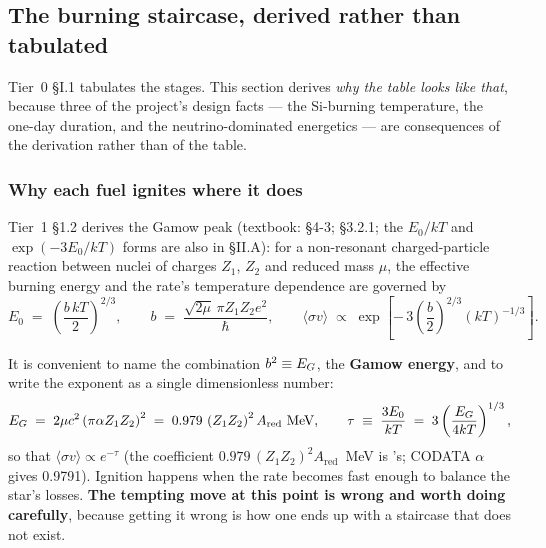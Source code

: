 \subsection{The burning staircase, derived rather than tabulated}
\label{sec:staircase}

Tier~0 \S I.1 tabulates the stages. This section derives \emph{why the table
looks like that}, because three of the project's design facts --- the
Si-burning temperature, the one-day duration, and the neutrino-dominated
energetics --- are consequences of the derivation rather than of the table.

\subsubsection{Why each fuel ignites where it does}
\label{sec:ignition}

Tier~1 \S1.2 derives the Gamow peak (textbook: \citealt{clayton1968} \S4-3;
\citealt{iliadis2015} \S3.2.1; the $E_0/kT$ and $\exp(-3E_0/kT)$ forms are also
in \citealt{adelberger2011} \S II.A): for a non-resonant charged-particle
reaction between nuclei of charges $Z_1$, $Z_2$ and reduced mass $\mu$, the
effective burning energy and the rate's temperature dependence are governed by
%
\begin{equation}
E_0 \;=\; \left(\frac{b\,kT}{2}\right)^{2/3},
\qquad
b \;=\; \frac{\sqrt{2\mu}\,\pi Z_1 Z_2 e^{2}}{\hbar},
\qquad
\langle\sigma v\rangle \;\propto\;
\exp\!\left[-\,3\left(\frac{b}{2}\right)^{2/3}\!(kT)^{-1/3}\right].
\label{eq:gamowpeak}
\end{equation}

It is convenient to name the combination $b^2 \equiv E_{G}$, the \textbf{Gamow
energy}, and to write the exponent as a single dimensionless number:
%
\begin{equation}
E_{G} \;=\; 2\mu c^{2}\left(\pi\alpha Z_1Z_2\right)^{2}
\;=\; 0.979\,\left(Z_1Z_2\right)^{2}A_{\mathrm{red}}\ \mathrm{MeV},
\qquad
\tau \;\equiv\; \frac{3E_0}{kT} \;=\; 3\left(\frac{E_{G}}{4kT}\right)^{1/3},
\label{eq:gamowenergy}
\end{equation}
%
so that $\langle\sigma v\rangle \propto e^{-\tau}$ (the coefficient
$0.979\,(Z_1Z_2)^2 A_{\mathrm{red}}$~MeV is \citet{rolfs1988}'s; CODATA
$\alpha$ gives 0.9791). Ignition happens when the rate becomes fast enough to
balance the star's losses. \textbf{The tempting move at this point is wrong and
worth doing carefully}, because getting it wrong is how one ends up with a
staircase that does not exist.

